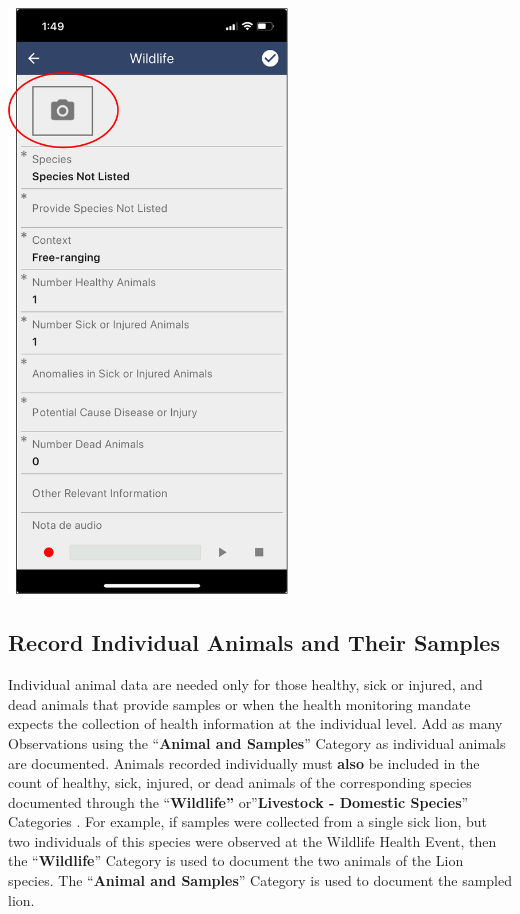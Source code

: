 \documentclass[
  letterpaper,
  DIV=11,
  numbers=noendperiod]{scrreprt}
\begin{document}
\includegraphics[width=2.91667in,height=\textheight]{Pictures_for_manual/Picture14.png}

\hypertarget{record-individual-animals-and-their-samples}{%
\subsection*{Record Individual Animals and Their
Samples}\label{record-individual-animals-and-their-samples}}

Individual animal data are needed only for those healthy, sick or
injured, and dead animals that provide samples or when the health
monitoring mandate expects the collection of health information at the
individual level. Add as many Observations using the ``\textbf{Animal
and Samples}'' Category as individual animals are documented. Animals
recorded individually must \textbf{also} be included in the count of
healthy, sick, injured, or dead animals of the corresponding species
documented through the ``\textbf{Wildlife''} or''\textbf{Livestock -
Domestic Species}'' Categories . For example, if samples were collected
from a single sick lion, but two individuals of this species were
observed at the Wildlife Health Event, then the ``\textbf{Wildlife}''
Category is used to document the two animals of the Lion species. The
``\textbf{Animal and Samples}'' Category is used to document the sampled
lion.
\end{document}
